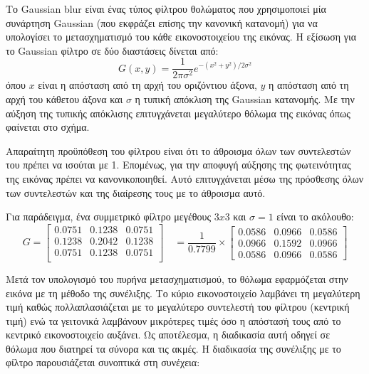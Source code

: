 \begin{itemize}[label={},leftmargin=*]
Το Gaussian blur είναι ένας τύπος φίλτρου θολώματος που χρησιμοποιεί μία συνάρτηση Gaussian (που εκφράζει επίσης την κανονική κατανομή) για να υπολογίσει το μετασχηματισμό του κάθε εικονοστοιχείου της εικόνας. Η εξίσωση για το Gaussian φίλτρο σε δύο διαστάσεις δίνεται από:
\begin{equation}
G(x,y) = \frac{1}{2\pi\sigma^2}e^{-(x^2+y^2)/2\sigma^2}
\end{equation}
όπου $x$  είναι η απόσταση από τη αρχή του οριζόντιου άξονα, $y$ η απόσταση από τη αρχή του κάθετου άξονα και $\sigma$ η τυπική απόκλιση της Gaussian κατανομής. Με την αύξηση της τυπικής απόκλισης επιτυγχάνεται μεγαλύτερο θόλωμα της εικόνας όπως φαίνεται στο σχήμα.

Απαραίτητη προϋπόθεση του φίλτρου είναι ότι το άθροισμα όλων των συντελεστών του πρέπει να ισούται με 1. Επομένως, για την αποφυγή αύξησης της φωτεινότητας της εικόνας πρέπει να κανονικοποιηθεί. Αυτό επιτυγχάνεται μέσω της πρόσθεσης όλων των συντελεστών και της διαίρεσης τους με το άθροισμα αυτό.

\newpage Για παράδειγμα, ένα συμμετρικό φίλτρο μεγέθους $3x3$ και $\sigma=1$ είναι το ακόλουθο:
\[
	G = \begin{bmatrix}
    0.0751 & 0.1238 & 0.0751  	\\
   	0.1238 & 0.2042 & 0.1238  	\\
    0.0751 & 0.1238 & 0.0751		\\
\end{bmatrix}\quad = \frac{1}{0.7799} \times
\begin{bmatrix}
    0.0586 & 0.0966 & 0.0586     \\
      0.0966 & 0.1592 & 0.0966   \\
    0.0586 & 0.0966 & 0.0586
\end{bmatrix}
\]

Μετά τον υπολογισμό του πυρήνα μετασχηματισμού, το θόλωμα εφαρμόζεται στην εικόνα με τη μέθοδο της συνέλιξης. Το κύριο εικονοστοιχείο λαμβάνει τη μεγαλύτερη τιμή καθώς πολλαπλασιάζεται με το μεγαλύτερο συντελεστή του φίλτρου (κεντρική τιμή) ενώ τα γειτονικά λαμβάνουν μικρότερες τιμές όσο η απόστασή τους από το κεντρικό εικονοστοιχείο αυξάνει. Ως αποτέλεσμα, η διαδικασία αυτή οδηγεί σε θόλωμα που διατηρεί τα σύνορα και τις ακμές. Η διαδικασία της συνέλιξης με το φίλτρο παρουσιάζεται συνοπτικά στη συνέχεια: \\ \\
\IncMargin{0.5em}
\begin{algorithm}[H]


\end{algorithm}
\end{itemize}
